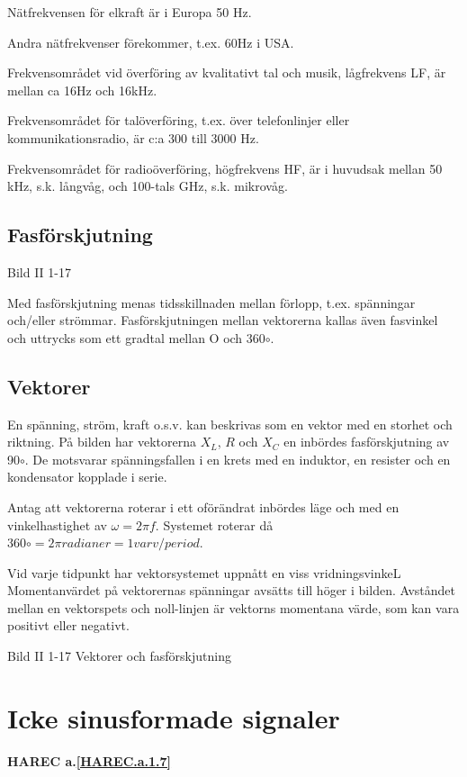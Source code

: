 Nätfrekvensen för elkraft är i Europa 50 Hz.

Andra nätfrekvenser förekommer, t.ex. 60Hz i USA.

Frekvensområdet vid överföring av kvalitativt tal och musik, lågfrekvens LF, är mellan ca 16Hz och 16kHz.

Frekvensområdet för talöverföring, t.ex. över telefonlinjer eller kommunikationsradio,
är c:a 300 till 3000 Hz.

Frekvensområdet för radioöverföring, högfrekvens HF, är i huvudsak mellan 50 kHz, s.k.
långvåg, och 100-tals GHz, s.k. mikrovåg.

\subsection{Fasförskjutning}

Bild II 1-17

Med fasförskjutning menas tidsskillnaden mellan förlopp, t.ex. spänningar och/eller
strömmar. Fasförskjutningen mellan vektorerna kallas även fasvinkel och uttrycks
som ett gradtal mellan O och 360$\circ$.

\subsection{Vektorer}

En spänning, ström, kraft o.s.v. kan beskrivas som en vektor med en storhet och riktning.
På bilden har vektorerna $X_L$, $R$ och $X_C$ en inbördes fasförskjutning av 90$\circ$.
De motsvarar spänningsfallen i en krets med en induktor, en resister och en kondensator
kopplade i serie.

Antag att vektorerna roterar i ett oförändrat inbördes läge och med en vinkelhastighet
av $\omega= 2\pi f$. Systemet roterar då $360\circ = 2\pi radianer = 1 varv/period$.

Vid varje tidpunkt har vektorsystemet uppnått en viss vridningsvinkeL Momentanvärdet på
vektorernas spänningar avsätts till höger i bilden. Avståndet mellan en vektorspets och
noll-linjen är vektorns momentana värde, som kan vara positivt eller negativt.

Bild II 1-17 Vektorer och fasförskjutning

\cleardoublepage

\section{Icke sinusformade signaler}
\textbf{HAREC a.\ref{HAREC.a.1.7}\label{myHAREC.a.1.7}}

